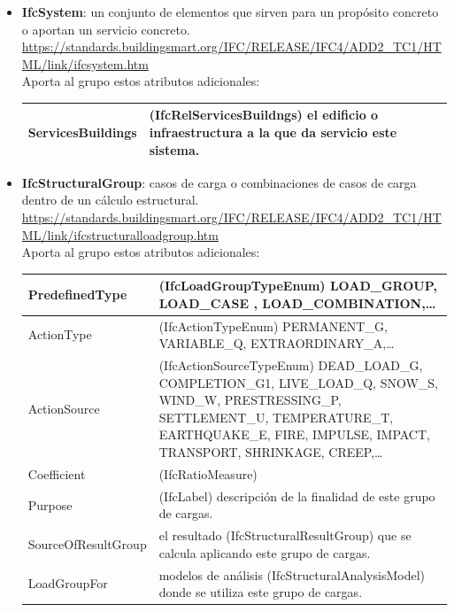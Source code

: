 \documentclass[spanish,12pt,a4paper,final,oneside]{book}
\begin{document}
\begin{itemize}
\item \textbf{IfcSystem}: un conjunto de elementos que sirven para un propósito concreto o aportan un servicio concreto.
\\ \url{https://standards.buildingsmart.org/IFC/RELEASE/IFC4/ADD2_TC1/HTML/link/ifcsystem.htm}
\\Aporta al grupo estos atributos adicionales:
\\ \begin{longtable}{|p{2.5cm} p{11cm}|}
\hline
ServicesBuildings & (IfcRelServicesBuildngs) el edificio o infraestructura a la que da servicio este sistema.
\\[0.1cm] \hline
\end{longtable}

\item \textbf{IfcStructuralGroup}: casos de carga o combinaciones de casos de carga dentro de un cálculo estructural.
\\ \url{https://standards.buildingsmart.org/IFC/RELEASE/IFC4/ADD2_TC1/HTML/link/ifcstructuralloadgroup.htm}
\\Aporta al grupo estos atributos adicionales:
\\ \begin{longtable}{|p{3cm} p{10cm}|}
\hline
PredefinedType & (IfcLoadGroupTypeEnum) LOAD\_GROUP, LOAD\_CASE	, LOAD\_COMBINATION,\ldots
\\[0.1cm] \hline
ActionType & (IfcActionTypeEnum) PERMANENT\_G, VARIABLE\_Q, EXTRAORDINARY\_A,\ldots
\\[0.1cm] \hline
ActionSource & (IfcActionSourceTypeEnum) DEAD\_LOAD\_G, COMPLETION\_G1, LIVE\_LOAD\_Q, SNOW\_S, WIND\_W, PRESTRESSING\_P, SETTLEMENT\_U, TEMPERATURE\_T, EARTHQUAKE\_E, FIRE, IMPULSE, IMPACT, TRANSPORT, SHRINKAGE, CREEP,\ldots
\\[0.1cm] \hline
Coefficient & (IfcRatioMeasure)
\\[0.1cm] \hline
Purpose & (IfcLabel) descripción de la finalidad de este grupo de cargas.
\\[0.1cm] \hline
SourceOfResultGroup & el resultado (IfcStructuralResultGroup) que se calcula aplicando este grupo de cargas.
\\[0.1cm] \hline
LoadGroupFor & modelos de análisis (IfcStructuralAnalysisModel) donde se utiliza este grupo de cargas.
\\[0.1cm] \hline
\end{longtable}



\end{itemize}
\end{document}
